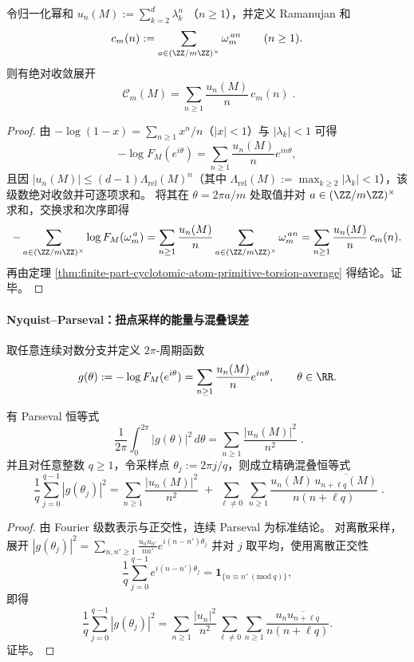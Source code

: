 \begin{corollary}\label{cor:finite-part-cyclotomic-atom-ramanujan-projection}
令归一化幂和
\(
u_n(M):=\sum_{k=2}^{d}\lambda_k^{n}
\)
（\(n\ge 1\)），并定义 Ramanujan 和
\[
c_m(n):=\sum_{a\in(\ZZ/m\ZZ)^\times}\omega_m^{\,an}\qquad(n\ge 1).
\]
则有绝对收敛展开
\[
\boxed{\;
\mathcal{C}_m(M)=\sum_{n\ge 1}\frac{u_n(M)}{n}\,c_m(n)\; }.
\]
\end{corollary}
\begin{proof}
由 \(-\log(1-x)=\sum_{n\ge 1}x^n/n\)（\(|x|<1\)）与 \(|\lambda_k|<1\) 可得
\[
-\log F_M(e^{i\theta})
=\sum_{n\ge 1}\frac{u_n(M)}{n}e^{in\theta},
\]
且因 \(|u_n(M)|\le (d-1)\Lambda_{\mathrm{rel}}(M)^n\)（其中 \(\Lambda_{\mathrm{rel}}(M):=\max_{k\ge 2}|\lambda_k|<1\)），该级数绝对收敛并可逐项求和。
将其在 \(\theta=2\pi a/m\) 处取值并对 \(a\in(\ZZ/m\ZZ)^\times\) 求和，交换求和次序即得
\[
-\sum_{a\in(\ZZ/m\ZZ)^\times}\log F_M(\omega_m^{\,a})
=\sum_{n\ge 1}\frac{u_n(M)}{n}\sum_{a\in(\ZZ/m\ZZ)^\times}\omega_m^{\,an}
=\sum_{n\ge 1}\frac{u_n(M)}{n}\,c_m(n).
\]
再由定理 \ref{thm:finite-part-cyclotomic-atom-primitive-torsion-average} 得结论。证毕。
\end{proof}

\paragraph{Nyquist--Parseval：扭点采样的能量与混叠误差}
取任意连续对数分支并定义 \(2\pi\)-周期函数
\[
g(\theta):=-\log F_M(e^{i\theta})
=\sum_{n\ge 1}\frac{u_n(M)}{n}e^{in\theta},
\qquad \theta\in\RR.
\]

\begin{theorem}\label{thm:finite-part-nyquist-parseval-aliasing}
有 Parseval 恒等式
\[
\boxed{\;
\frac{1}{2\pi}\int_{0}^{2\pi}|g(\theta)|^2\,d\theta=\sum_{n\ge 1}\frac{|u_n(M)|^2}{n^2}\; }.
\]
并且对任意整数 \(q\ge 1\)，令采样点 \(\theta_j:=2\pi j/q\)，则成立精确混叠恒等式
\[
\boxed{\;
\frac{1}{q}\sum_{j=0}^{q-1}|g(\theta_j)|^2
=\sum_{n\ge 1}\frac{|u_n(M)|^2}{n^2}
\;+\;
\sum_{\ell\ne 0}\ \sum_{n\ge 1}\frac{u_n(M)\,\overline{u_{n+\ell q}(M)}}{n(n+\ell q)}\; }.
\]
\end{theorem}
\begin{proof}
由 Fourier 级数表示与正交性，连续 Parseval 为标准结论。
对离散采样，展开
\(
|g(\theta_j)|^2
=\sum_{n,n'\ge 1}\frac{u_n\overline{u_{n'}}}{nn'}e^{i(n-n')\theta_j}
\)
并对 \(j\) 取平均，使用离散正交性
\[
\frac{1}{q}\sum_{j=0}^{q-1}e^{i(n-n')\theta_j}
=
\mathbf 1_{\{n\equiv n'\ (\mathrm{mod}\ q)\}},
\]
即得
\[
\frac{1}{q}\sum_{j=0}^{q-1}|g(\theta_j)|^2
=\sum_{n\ge 1}\frac{|u_n|^2}{n^2}
\sum_{\ell\ne 0}\sum_{n\ge 1}\frac{u_n\overline{u_{n+\ell q}}}{n(n+\ell q)}.
\]
证毕。
\end{proof}

